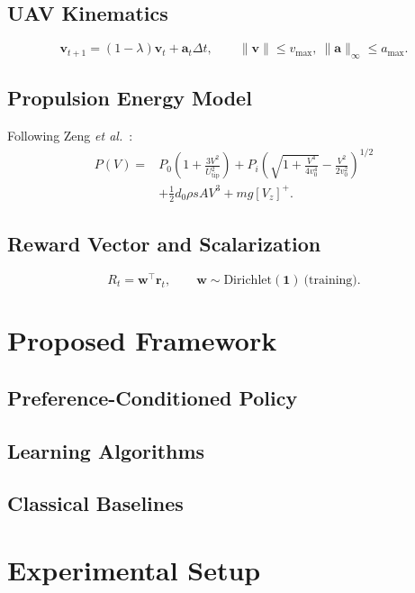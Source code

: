 \documentclass[journal]{IEEEtran}
\begin{document}
\subsection{UAV Kinematics}
\begin{equation}
\mathbf{v}_{t+1}=(1-\lambda)\mathbf{v}_t+\mathbf{a}_t\Delta t,\qquad
\|\mathbf{v}\|\le v_{\max},\ \|\mathbf{a}\|_\infty\le a_{\max}.
\end{equation}

\subsection{Propulsion Energy Model}
Following Zeng \emph{et al.}~\cite{zeng2019energy}:
\begin{equation}
\begin{aligned}
P(V)={}&P_0\!\left(1+\frac{3V^2}{U_{\mathrm{tip}}^2}\right)
+P_i\!\left(\sqrt{1+\frac{V^4}{4v_0^4}}-\frac{V^2}{2v_0^2}\right)^{\!1/2}\\
&+\tfrac12 d_0\rho s A V^3 + mg[V_z]^+ .
\end{aligned}
\end{equation}

\subsection{Reward Vector and Scalarization}
\begin{equation}
R_t=\mathbf{w}^\top\mathbf{r}_t,\qquad \mathbf{w}\sim\mathrm{Dirichlet}(\mathbf{1})
\ \text{(training)}.
\end{equation}

\section{Proposed Framework}
\subsection{Preference-Conditioned Policy}
\subsection{Learning Algorithms}
\subsection{Classical Baselines}

\section{Experimental Setup}
\end{document}
